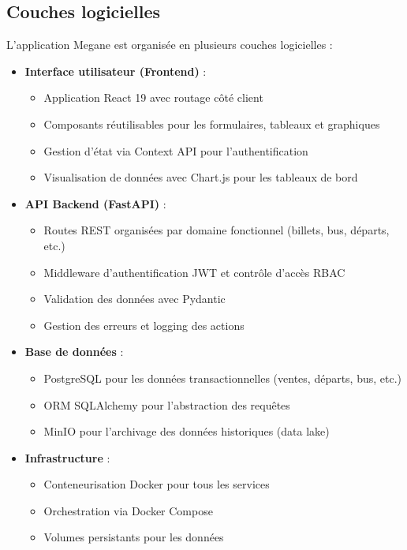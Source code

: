 \documentclass[a4paper, 12pt]{book}
\begin{document}
\subsection{Couches logicielles}

L'application Megane est organisée en plusieurs couches logicielles :

\begin{itemize}
    \item \textbf{Interface utilisateur (Frontend)} : 
    \begin{itemize}
        \item Application React 19 avec routage côté client
        \item Composants réutilisables pour les formulaires, tableaux et graphiques
        \item Gestion d'état via Context API pour l'authentification
        \item Visualisation de données avec Chart.js pour les tableaux de bord
    \end{itemize}
    
    \item \textbf{API Backend (FastAPI)} :
    \begin{itemize}
        \item Routes REST organisées par domaine fonctionnel (billets, bus, départs, etc.)
        \item Middleware d'authentification JWT et contrôle d'accès RBAC
        \item Validation des données avec Pydantic
        \item Gestion des erreurs et logging des actions
    \end{itemize}
    
    \item \textbf{Base de données} :
    \begin{itemize}
        \item PostgreSQL pour les données transactionnelles (ventes, départs, bus, etc.)
        \item ORM SQLAlchemy pour l'abstraction des requêtes
        \item MinIO pour l'archivage des données historiques (data lake)
    \end{itemize}
    
    \item \textbf{Infrastructure} :
    \begin{itemize}
        \item Conteneurisation Docker pour tous les services
        \item Orchestration via Docker Compose
        \item Volumes persistants pour les données
    \end{itemize}
\end{itemize}
\end{document}
